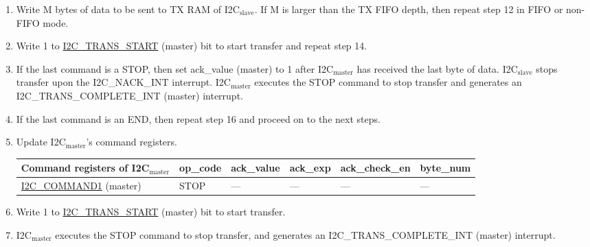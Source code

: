 \documentclass[main\_\_EN.tex]{subfiles}
\begin{document}
\begin{enumerate}
\item Write M bytes of data to be sent to TX RAM of I2C$_\text{slave}$. If M is larger than the TX FIFO depth, then repeat step 12 in FIFO or non-FIFO mode.
\item Write 1 to \hyperref[fielddesc:I2CTRANSSTART]{I2C\_TRANS\_START} (master) bit to start transfer and repeat step 14.
\item If the last command is a STOP, then set ack\_value (master) to 1 after I2C$_\text{master}$ has received the last byte of data. I2C$_\text{slave}$ stops transfer upon the I2C\_NACK\_INT interrupt. I2C$_\text{master}$ executes the STOP command to stop transfer and generates an I2C\_TRANS\_COMPLETE\_INT (master) interrupt.
\item If the last command is an END, then repeat step 16 and proceed on to the next steps.
\item Update I2C$_\text{master}$'s command registers.
\begin{longtable}{ | p{4cm} | p{2cm} | p{2cm} | p{2cm} |p{2cm} | p{2cm} |}
\hline\rowcolor{lightgray}
Command registers of I2C$_\text{master}$& op\_code & ack\_value&ack\_exp&ack\_check\_en&byte\_num  \\ \hline
\hyperref[fielddesc:I2CCOMMAND1]{I2C\_COMMAND1} (master)& STOP& ---&---&---&---  \\ \hline
\end{longtable}
\item Write 1 to \hyperref[fielddesc:I2CTRANSSTART]{I2C\_TRANS\_START} (master) bit to start transfer.
\item I2C$_\text{master}$ executes the STOP command to stop transfer, and generates an I2C\_TRANS\_COMPLETE\_INT (master) interrupt.

\end{enumerate}
\end{document}
